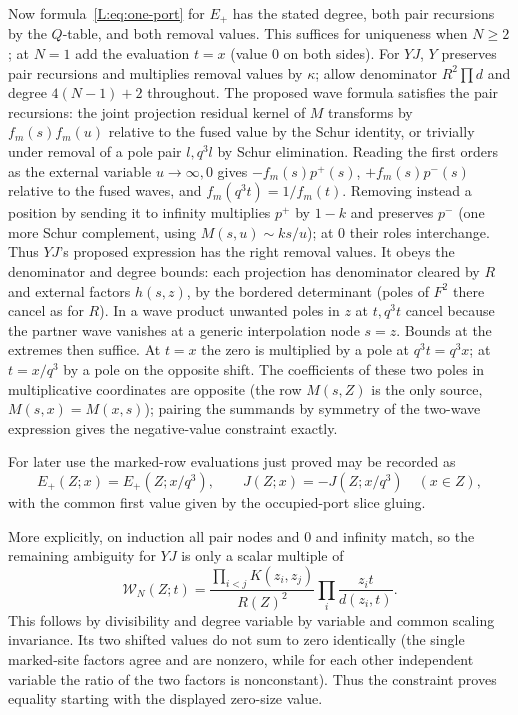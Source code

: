 \documentclass[11pt]{article}
\numberwithin{equation}{section}
\theoremstyle{definition}\newtheorem{definition}[theorem]{Definition}
\theoremstyle{remark}\newtheorem{remark}[theorem]{Remark}
\begin{document}
Now formula~\eqref{L:eq:one-port} for \(E_+\) has the stated degree, both pair recursions by the \(Q\)-table, and both removal values. This suffices for uniqueness when \(N\ge2\); at \(N=1\) add the evaluation \(t=x\) (value 0 on both sides). For \(YJ\), \(Y\) preserves pair recursions and multiplies removal values by \(\kappa\); allow denominator \(R^2\prod d\) and degree \(4(N-1)+2\) throughout. The proposed wave formula satisfies the pair recursions: the joint projection residual kernel of \(M\) transforms by \(f_m(s)f_m(u)\) relative to the fused value by the Schur identity, or trivially under removal of a pole pair \(l,q^3 l\) by Schur elimination. Reading the first orders as the external variable \(u\to\infty,0\) gives \(-f_m(s)p^+(s)\), \(+f_m(s)p^-(s)\) relative to the fused waves, and \(f_m(q^3t)=1/f_m(t)\). Removing instead a position by sending it to infinity multiplies \(p^+\) by \(1-k\) and preserves \(p^-\) (one more Schur complement, using \(M(s,u)\sim k s/u\)); at 0 their roles interchange. Thus \(YJ\)'s proposed expression has the right removal values. It obeys the denominator and degree bounds: each projection has denominator cleared by \(R\) and external factors \(h(s,z)\), by the bordered determinant (poles of \(F^2\) there cancel as for \(R\)). In a wave product unwanted poles in \(z\) at \(t,q^3t\) cancel because the partner wave vanishes at a generic interpolation node \(s=z\). Bounds at the extremes then suffice. At \(t=x\) the zero is multiplied by a pole at \(q^3t=q^3x\); at \(t=x/q^3\) by a pole on the opposite shift. The coefficients of these two poles in multiplicative coordinates are opposite (the row \(M(s,Z)\) is the only source, \(M(s,x)=M(x,s)\)); pairing the summands by symmetry of the two-wave expression gives the negative-value constraint exactly.

For later use the marked-row evaluations just proved may be recorded as
\begin{equation}\label{L:eq:mark-evaluation}
 E_+(Z;x)=E_+(Z;x/q^3),\qquad J(Z;x)=-J(Z;x/q^3)
 \quad(x\in Z),
\end{equation}
with the common first value given by the occupied-port slice gluing.

More explicitly, on induction all pair nodes and 0 and infinity match, so the remaining ambiguity for \(YJ\) is only a scalar multiple of
\[
 \mathcal W_N(Z;t)=\frac{\prod_{i<j}K(z_i,z_j)}{R(Z)^2}
                     \prod_i \frac{z_i t}{d(z_i,t)}.
\]
This follows by divisibility and degree variable by variable and common scaling invariance. Its two shifted values do not sum to zero identically (the single marked-site factors agree and are nonzero, while for each other independent variable the ratio of the two factors is nonconstant). Thus the constraint proves equality starting with the displayed zero-size value.
\end{document}
